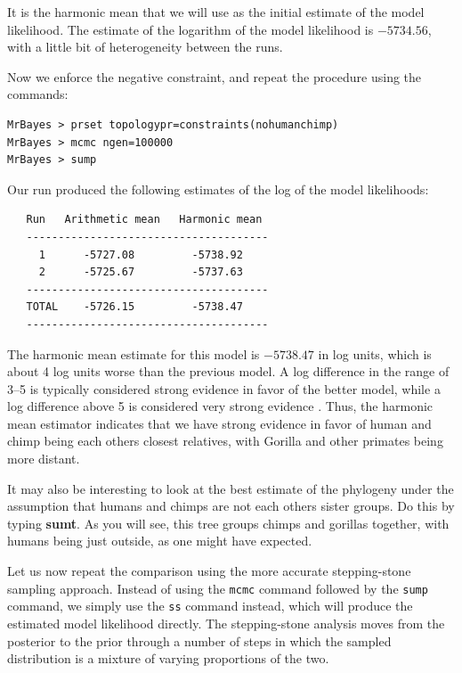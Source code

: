 \documentclass[12pt]{book}
\newcommand{\ttt}[1]{\texttt{#1} }
\begin{document}
It is the harmonic mean that we will use as the initial estimate of the model likelihood. The
estimate of the logarithm of the model likelihood is $-5734.56$, with a little bit of heterogeneity
between the runs.

Now we enforce the negative constraint, and repeat the procedure using the commands:

\begin{singlespacing}
\begin{verbatim}
MrBayes > prset topologypr=constraints(nohumanchimp)
MrBayes > mcmc ngen=100000
MrBayes > sump
\end{verbatim}
\end{singlespacing}

Our run produced the following estimates of the log of the model likelihoods:

\begin{singlespacing}
\begin{verbatim}
   Run   Arithmetic mean   Harmonic mean
   --------------------------------------
     1      -5727.08         -5738.92
     2      -5725.67         -5737.63
   --------------------------------------
   TOTAL    -5726.15         -5738.47
   --------------------------------------
\end{verbatim}
\end{singlespacing}

The harmonic mean estimate for this model is $-5738.47$ in log units, which is about 4 log units
worse than the previous model. A log difference in the range of 3--5 is typically considered strong
evidence in favor of the better model, while a log difference above 5 is considered very strong
evidence \citep{kass95}. Thus, the harmonic mean estimator indicates that we have strong evidence
in favor of human and chimp being each others closest relatives, with Gorilla and other primates
being more distant.

It may also be interesting to look at the best estimate of the phylogeny under the assumption that
humans and chimps are not each others sister groups. Do this by typing \textbf{sumt}. As you will
see, this tree groups chimps and gorillas together, with humans being just outside, as one might
have expected.

Let us now repeat the comparison using the more accurate stepping-stone sampling approach. Instead
of using the \ttt{mcmc} command followed by the \ttt{sump} command, we simply use the \ttt{ss}
command instead, which will produce the estimated model likelihood directly. The stepping-stone
analysis moves from the posterior to the prior through a number of steps in which the sampled
distribution is a mixture of varying proportions of the two.
\end{document}
